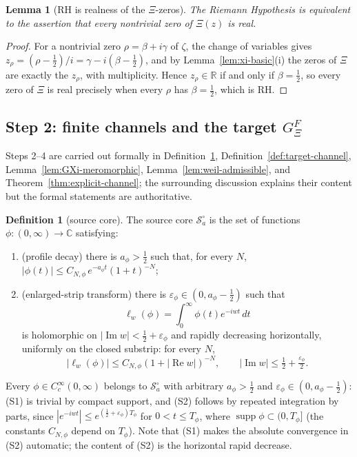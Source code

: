 \documentclass[11pt]{amsart}
\newtheorem{lemma}[theorem]{Lemma}
\theoremstyle{definition}
\newtheorem{definition}[theorem]{Definition}
\theoremstyle{remark}
\theoremstyle{definition}
\renewcommand{\Re}{\operatorname{Re}}
\renewcommand{\Im}{\operatorname{Im}}
\newcommand{\half}{\tfrac{1}{2}}
\newcommand{\eps}{\varepsilon}
\newcommand{\supp}{\operatorname{supp}}
\newcommand{\cS}{\mathcal{S}}
\newcommand{\R}{\mathbb{R}}
\newcommand{\C}{\mathbb{C}}
\newcommand{\GXi}{G_\Xi}
\begin{document}
\begin{lemma}[RH is realness of the $\Xi$-zeros]\label{lem:rh-translation}
The Riemann Hypothesis is equivalent to the assertion that every nontrivial zero of $\Xi(z)$ is real.
\end{lemma}

\begin{proof}
For a nontrivial zero $\rho=\beta+i\gamma$ of $\zeta$, the change of variables gives
$z_\rho=(\rho-\half)/i=\gamma-i(\beta-\half)$, and by Lemma~\ref{lem:xi-basic}(i) the zeros of $\Xi$
are exactly the $z_\rho$, with multiplicity.  Hence $z_\rho\in\R$ if and only if $\beta=\half$, so every
zero of $\Xi$ is real precisely when every $\rho$ has $\beta=\half$, which is RH.
\end{proof}

\subsection{Step 2: finite channels and the target \texorpdfstring{$\GXi^F$}{GXiF}}

Steps 2--4 are carried out formally in Definition~\ref{def:core}, Definition~\ref{def:target-channel},
Lemma~\ref{lem:GXi-meromorphic}, Lemma~\ref{lem:weil-admissible}, and Theorem~\ref{thm:explicit-channel};
the surrounding discussion explains their content but the formal statements are authoritative.

\begin{definition}[source core]\label{def:core}
The source core $\cS_a^\circ$ is the set of functions $\phi:(0,\infty)\to\C$ satisfying:
\begin{enumerate}[label=\textnormal{(S\arabic*)}]
\item \textnormal{(profile decay)} there is $a_\phi>\half$ such that, for every $N$,
$|\phi(t)|\le C_{N,\phi}\,e^{-a_\phi t}(1+t)^{-N}$;
\item \textnormal{(enlarged-strip transform)} there is $\eps_\phi\in(0,a_\phi-\half)$ such that
\[
   \ell_w(\phi)=\int_0^\infty\phi(t)e^{-iwt}\,dt
\]
is holomorphic on $|\Im w|<\half+\eps_\phi$ and rapidly decreasing horizontally, uniformly on the
closed substrip: for every $N$,
\[
   |\ell_w(\phi)|\le C_{N,\phi}(1+|\Re w|)^{-N},
   \qquad |\Im w|\le\half+\tfrac{\eps_\phi}{2}.
\]
\end{enumerate}
Every $\phi\in C_c^\infty(0,\infty)$ belongs to $\cS_a^\circ$ with arbitrary $a_\phi>\half$ and
$\eps_\phi\in(0,a_\phi-\half)$: \textnormal{(S1)} is trivial by compact support, and
\textnormal{(S2)} follows by repeated integration by parts, since
$|e^{-iwt}|\le e^{(\half+\eps_\phi)T_\phi}$ for $0<t\le T_\phi$, where $\supp\phi\subset(0,T_\phi]$
(the constants $C_{N,\phi}$ depend on $T_\phi$).  Note that \textnormal{(S1)} makes
the absolute convergence in \textnormal{(S2)} automatic; the content of \textnormal{(S2)} is the
horizontal rapid decrease.
\end{definition}
\end{document}
